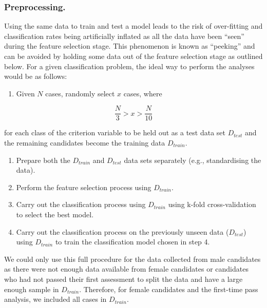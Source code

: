 \documentclass[
  12pt,
  a4paper,
]{book}
\providecommand{\tightlist}{%
  \setlength{\itemsep}{0pt}\setlength{\parskip}{0pt}}
\begin{document}
\hypertarget{preprocessing.}{%
\subsubsection{Preprocessing.}\label{preprocessing.}}

Using the same data to train and test a model leads to the risk of over-fitting and classification rates being artificially inflated as all the data have been ``seen'' during the feature selection stage. This phenomenon is known as ``peeking'' \citep{Kuncheva2018, Reunanen2003a, Smialowski2010} and can be avoided by holding some data out of the feature selection stage as outlined below. For a given classification problem, the ideal way to perform the analyses would be as follows:

\begin{enumerate}
\def\labelenumi{\arabic{enumi}.}
\tightlist
\item
  Given \(N\) cases, randomly select \(x\) cases, where
\end{enumerate}

\[\frac{N}{3} > x > \frac{N}{10}\]

for each class of the criterion variable to be held out as a test data set \(D_{test}\) and the remaining candidates become the training data \(D_{train}\).

\begin{enumerate}
\def\labelenumi{\arabic{enumi}.}
\setcounter{enumi}{1}
\tightlist
\item
  Prepare both the \(D_{train}\) and \(D_{test}\) data sets separately (e.g., standardising the data).
\item
  Perform the feature selection process using \(D_{train}\).
\item
  Carry out the classification process using \(D_{train}\) using k-fold cross-validation to select the best model.
\item
  Carry out the classification process on the previously unseen data (\(D_{test}\)) using \(D_{train}\) to train the classification model chosen in step 4.
\end{enumerate}

We could only use this full procedure for the data collected from male candidates as there were not enough data available from female candidates or candidates who had not passed their first assessment to split the data and have a large enough sample in \(D_{train}\). Therefore, for female candidates and the first-time pass analysis, we included all cases in \(D_{train}\).
\end{document}
